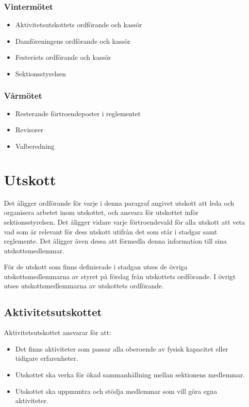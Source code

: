 \documentclass{datateknologsektionen-document}
\begin{document}
\subsubsection{Vintermötet}
\begin{itemize}
  \item Aktivitetsutskottets ordförande och kassör
  \item Damföreningens ordförande och kassör
  \item Festeriets ordförande och kassör
  \item Sektionsstyrelsen
\end{itemize}

\subsubsection{Vårmötet}
\begin{itemize}
  \item Resterande förtroendeposter i reglementet
  \item Revisorer
  \item Valberedning
\end{itemize}

\section{Utskott}
Det åligger ordförande för varje i denna paragraf angivet utskott att leda och organisera arbetet inom utskottet, och
ansvara för utskottet inför sektionsstyrelsen. Det åligger vidare varje förtroendevald
för alla utskott att veta vad som är relevant för dess utskott utifrån det som står i
stadgar samt reglemente. Det åligger även dessa att förmedla denna information till
sina utskottsmedlemmar.

För de utskott som finns definierade i stadgan utses de övriga utskottsmedlemmarna av
styret på förslag från utskottets ordförande. I övrigt utses utskottsmedlemmarna av
utskottets ordförande.

\subsection{Aktivitetsutskottet}
Aktivitetsutskottet ansvarar för att:
\begin{itemize}
  \item Det finns aktiviteter som passar alla oberoende av fysisk kapacitet eller tidigare erfarenheter.
  \item Utskottet ska verka för ökad sammanhållning mellan sektionens medlemmar.
  \item Utskottet ska uppmuntra och stödja medlemmar som vill göra egna aktiviteter.
\end{itemize}
\end{document}
